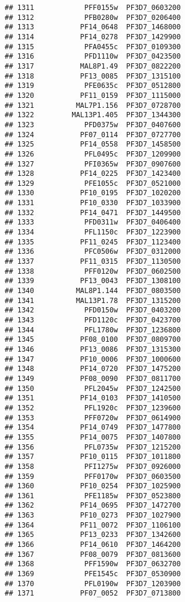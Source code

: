 \documentclass[12pt, a4paper]{article}\usepackage[]{graphicx}\usepackage[]{color}
\makeatletter
\newenvironment{kframe}{%
 \def\at@end@of@kframe{}%
 \ifinner\ifhmode%
  \def\at@end@of@kframe{\end{minipage}}%
  \begin{minipage}{\columnwidth}%
 \fi\fi%
 \def\FrameCommand##1{\hskip\@totalleftmargin \hskip-\fboxsep
 \colorbox{shadecolor}{##1}\hskip-\fboxsep
     \hskip-\linewidth \hskip-\@totalleftmargin \hskip\columnwidth}%
 \MakeFramed {\advance\hsize-\width
   \@totalleftmargin\z@ \linewidth\hsize
   \@setminipage}}%
 {\par\unskip\endMakeFramed%
 \at@end@of@kframe}
\newenvironment{knitrout}{}{} %
\makeatother
\begin{document}
\begin{knitrout}
\begin{kframe}
\begin{verbatim}
## 1311            PFF0155w  PF3D7_0603200
## 1312            PFB0280w  PF3D7_0206400
## 1313           PF14_0648  PF3D7_1468000
## 1314           PF14_0278  PF3D7_1429900
## 1315            PFA0455c  PF3D7_0109300
## 1316            PFD1110w  PF3D7_0423500
## 1317           MAL8P1.49  PF3D7_0822200
## 1318           PF13_0085  PF3D7_1315100
## 1319            PFE0635c  PF3D7_0512800
## 1320           PF11_0159  PF3D7_1115000
## 1321          MAL7P1.156  PF3D7_0728700
## 1322         MAL13P1.405  PF3D7_1344300
## 1323            PFD0375w  PF3D7_0407600
## 1324           PF07_0114  PF3D7_0727700
## 1325           PF14_0558  PF3D7_1458500
## 1326            PFL0495c  PF3D7_1209900
## 1327            PFI0365w  PF3D7_0907600
## 1328           PF14_0225  PF3D7_1423400
## 1329            PFE1055c  PF3D7_0521000
## 1330           PF10_0195  PF3D7_1020200
## 1331           PF10_0330  PF3D7_1033900
## 1332           PF14_0471  PF3D7_1449500
## 1333            PFD0311w  PF3D7_0406400
## 1334            PFL1150c  PF3D7_1223900
## 1335           PF11_0245  PF3D7_1123400
## 1336            PFC0506w  PF3D7_0312000
## 1337           PF11_0315  PF3D7_1130500
## 1338            PFF0120w  PF3D7_0602500
## 1339           PF13_0043  PF3D7_1308100
## 1340          MAL8P1.144  PF3D7_0803500
## 1341          MAL13P1.78  PF3D7_1315200
## 1342            PFD0150w  PF3D7_0403200
## 1343            PFD1120c  PF3D7_0423700
## 1344            PFL1780w  PF3D7_1236800
## 1345           PF08_0100  PF3D7_0809700
## 1346           PF13_0086  PF3D7_1315300
## 1347           PF10_0006  PF3D7_1000600
## 1348           PF14_0720  PF3D7_1475200
## 1349           PF08_0090  PF3D7_0811700
## 1350            PFL2045w  PF3D7_1242500
## 1351           PF14_0103  PF3D7_1410500
## 1352            PFL1920c  PF3D7_1239600
## 1353            PFF0720w  PF3D7_0614900
## 1354           PF14_0749  PF3D7_1477800
## 1355           PF14_0075  PF3D7_1407800
## 1356            PFL0735w  PF3D7_1215200
## 1357           PF10_0115  PF3D7_1011800
## 1358            PFI1275w  PF3D7_0926000
## 1359            PFF0170w  PF3D7_0603500
## 1360           PF10_0254  PF3D7_1025900
## 1361            PFE1185w  PF3D7_0523800
## 1362           PF14_0695  PF3D7_1472700
## 1363           PF10_0273  PF3D7_1027900
## 1364           PF11_0072  PF3D7_1106100
## 1365           PF13_0233  PF3D7_1342600
## 1366           PF14_0610  PF3D7_1464200
## 1367           PF08_0079  PF3D7_0813600
## 1368            PFF1590w  PF3D7_0632700
## 1369            PFE1545c  PF3D7_0530900
## 1370            PFL0190w  PF3D7_1203900
## 1371           PF07_0052  PF3D7_0713800

\end{verbatim}
\end{kframe}
\end{knitrout}
\end{document}

